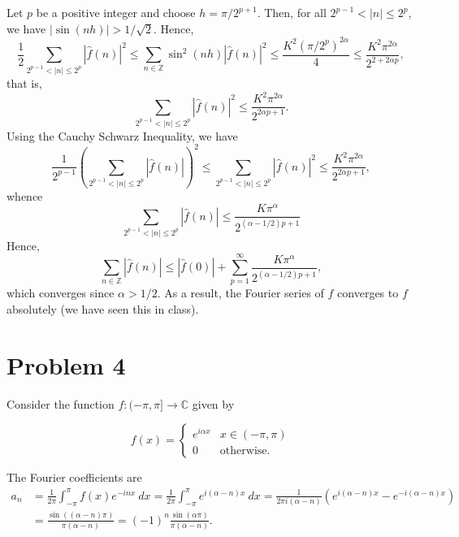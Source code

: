 \documentclass[12pt]{amsart}
\newcommand{\Z}{\mathbb{Z}}
\newcommand{\bbC}{\mathbb{C}}
\newcommand{\wh}[1]{\widehat{#1}}
\begin{document}
\begin{enumerate}[label=(\alph*)]
	Let $p$ be a positive integer and choose $h = \pi/2^{p + 1}$. Then, for all $2^{p - 1} < |n|\le 2^p$, we have $|\sin(nh)| > 1/\sqrt{2}$. Hence, 
	\begin{equation*}
		\frac{1}{2}\sum_{2^{p - 1} < |n|\le 2^p}|\wh f(n)|^2\le\sum_{n\in\Z}\sin^2(nh)|\wh f(n)|^2\le \frac{K^2 (\pi/2^p)^{2\alpha}}{4}\le\frac{K^2\pi^{2\alpha}}{2^{2 + 2\alpha p}},
	\end{equation*}
	that is, 
	\begin{equation*}
		\sum_{2^{p - 1} < |n|\le 2^p}|\wh f(n)|^2\le\frac{K^2\pi^{2\alpha}}{2^{2\alpha p + 1}}.
	\end{equation*}
	Using the Cauchy Schwarz Inequality, we have 
	\begin{equation*}
		\frac{1}{2^{p - 1}}\left(\sum_{2^{p - 1} < |n|\le 2^p}|\wh f(n)|\right)^2\le\sum_{2^{p - 1} < |n|\le 2^p}|\wh f(n)|^2\le\frac{K^2\pi^{2\alpha}}{2^{2\alpha p + 1}},
	\end{equation*}
	whence 
	\begin{equation*}
		\sum_{2^{p - 1} < |n|\le 2^p}|\wh f(n)|\le\frac{K\pi^\alpha}{2^{(\alpha - 1/2)p + 1}}
	\end{equation*}
	Hence, 
	\begin{equation*}
		\sum_{n\in\Z} |\wh f(n)|\le|\wh f(0)| + \sum_{p = 1}^\infty\frac{K\pi^\alpha}{2^{(\alpha - 1/2)p + 1}},
	\end{equation*}
	which converges since $\alpha > 1/2$. As a result, the Fourier series of $f$ converges to $f$ absolutely (we have seen this in class).
\end{enumerate}

\section*{Problem 4}

Consider the function $f:(-\pi,\pi]\to\bbC$ given by

\begin{equation*}
	f(x) = 
	\begin{cases}
		e^{i\alpha x} & x\in (-\pi, \pi)\\
		0 & \text{otherwise}.
	\end{cases}
\end{equation*}

The Fourier coefficients are 
\begin{align*}
	a_n &= \frac{1}{2\pi}\int_{-\pi}^\pi f(x)e^{-inx}~dx = \frac{1}{2\pi}\int_{-\pi}^\pi e^{i(\alpha - n)x}~dx = \frac{1}{2\pi i(\alpha - n)}\left(e^{i(\alpha - n)x} - e^{-i(\alpha - n)x}\right)\\
	&= \frac{\sin\left((\alpha - n)\pi\right)}{\pi(\alpha - n)} = (-1)^n\frac{\sin(\alpha\pi)}{\pi(\alpha - n)}.
\end{align*}
\end{document}

